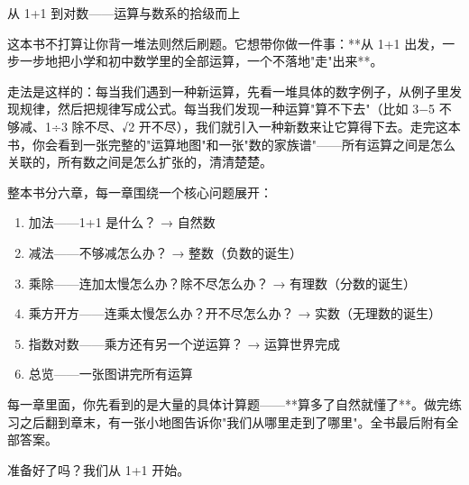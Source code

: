 \documentclass[a4paper,12pt]{ctexart}
\begin{document}
\pagestyle{empty}

\begin{center}
  \large 从 1+1 到对数——运算与数系的拾级而上
\end{center}
\vspace{0.3cm}


这本书不打算让你背一堆法则然后刷题。它想带你做一件事：**从 1+1 出发，一步一步地把小学和初中数学里的全部运算，一个不落地"走"出来**。

走法是这样的：每当我们遇到一种新运算，先看一堆具体的数字例子，从例子里发现规律，然后把规律写成公式。每当我们发现一种运算"算不下去"（比如 3−5 不够减、1÷3 除不尽、√2 开不尽），我们就引入一种新数来让它算得下去。走完这本书，你会看到一张完整的"运算地图"和一张"数的家族谱"——所有运算之间是怎么关联的，所有数之间是怎么扩张的，清清楚楚。

整本书分六章，每一章围绕一个核心问题展开：
\begin{enumerate}
  \item 加法——1+1 是什么？ \quad → 自然数
  \item 减法——不够减怎么办？ \quad → 整数（负数的诞生）
  \item 乘除——连加太慢怎么办？除不尽怎么办？ \quad → 有理数（分数的诞生）
  \item 乘方开方——连乘太慢怎么办？开不尽怎么办？ \quad → 实数（无理数的诞生）
  \item 指数对数——乘方还有另一个逆运算？ \quad → 运算世界完成
  \item 总览——一张图讲完所有运算
\end{enumerate}

每一章里面，你先看到的是大量的具体计算题——**算多了自然就懂了**。做完练习之后翻到章末，有一张小地图告诉你"我们从哪里走到了哪里"。全书最后附有全部答案。

准备好了吗？我们从 1+1 开始。

\newpage

\pagestyle{fancy}
\tableofcontents
\newpage








\newpage

\end{document}
